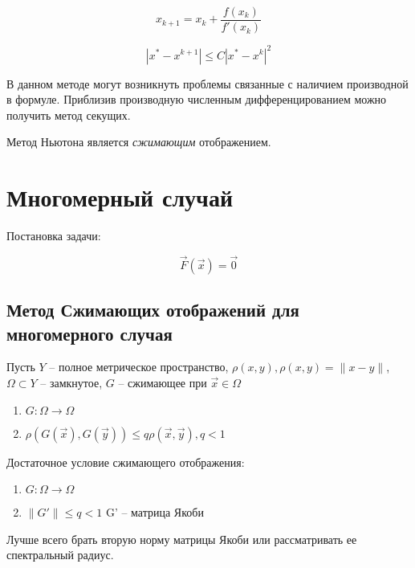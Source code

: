 \documentclass[10pt,a4paper]{article}
\begin{document}
		\begin{equation}
			x_{k + 1} = x_{k} + \frac{f\left(x_{k}\right)}{f'\left(x_{k}\right)}
		\end{equation}
		
		\begin{equation}
			\left|x^{*} - x^{k + 1}\right| \leqslant C 
			\left|x^{*} - x^{k}\right|^{2}
		\end{equation}
		
		В данном методе могут возникнуть проблемы связанные с наличием 
		производной в формуле. Приблизив производную численным 
		дифференцированием можно получить метод секущих.
		
		Метод Ньютона является \textit{сжимающим} отображением.
		
	\section{Многомерный случай}
	
		Постановка задачи:
		
		\begin{equation}
			\vec{F}\left(\vec{x}\right) = \vec{0}
		\end{equation}
		\subsection{Метод Сжимающих отображений для многомерного случая}
		Пусть $Y$ -- полное метрическое пространство, $\rho\left(x, y\right),
		\rho\left(x, y\right) = \parallel x - y\parallel$, $\Omega \subset Y$ --
		замкнутое, $G$ -- сжимающее при $\vec{x} \in \Omega$
		
		\begin{enumerate}
			\item $G: \Omega \rightarrow \Omega$
			\item $\rho\left(G\left(\vec{x}\right),
			G\left(\vec{y}\right)\right)\leqslant q\rho\left(\vec{x}, \vec{y}
			\right), q < 1$ 
		\end{enumerate}
		
		Достаточное условие сжимающего отображения:
		
		\begin{enumerate}
			\item $G: \Omega \rightarrow \Omega$
			\item $\parallel G'\parallel \leqslant q < 1$ G' -- матрица Якоби
		\end{enumerate}
		
		Лучше всего брать вторую норму матрицы Якоби или рассматривать ее 
		спектральный радиус.
		
\end{document}
